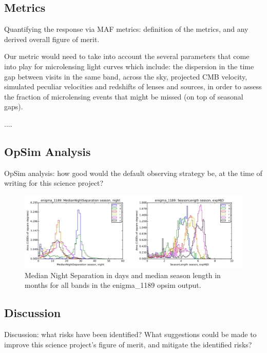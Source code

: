 \subsection{Metrics}
\label{sec:\secname:metrics}

Quantifying the response via MAF metrics: definition of the metrics,
and any derived overall figure of merit.

Our metric would need to take into account the several parameters that come into play for microlensing light curves which include: the dispersion in the time gap
between visits in the same band, across the sky, projected CMB velocity, simulated peculiar velocities and redshifts of lenses and sources, in order to assess
the fraction of microlensing events that might be missed (on top of
seasonal gaps).

....



\subsection{OpSim Analysis}
\label{sec:\secname:analysis}

OpSim analysis: how good would the default observing strategy be, at
the time of writing for this science project?

\begin{center}
\begin{figure}
\includegraphics[width=\textwidth]{figs/agn/enigma_1189_NightSep_seasonLength.pdf}
\caption{Median Night Separation in days and median season length in months for all bands in the enigma\_1189 opsim output.}
\label{PSDvsFreq}
\end{figure}
\end{center}


\subsection{Discussion}
\label{sec:\secname:discussion}

Discussion: what risks have been identified? What suggestions could be
made to improve this science project's figure of merit, and mitigate
the identified risks?



\navigationbar
